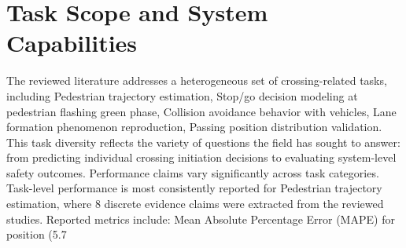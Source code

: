 \documentclass{article}
\begin{document}
\section{Task Scope and System Capabilities}
The reviewed literature addresses a heterogeneous set of crossing-related tasks, including Pedestrian trajectory estimation, Stop/go decision modeling at pedestrian flashing green phase, Collision avoidance behavior with vehicles, Lane formation phenomenon reproduction, Passing position distribution validation. This task diversity reflects the variety of questions the field has sought to answer: from predicting individual crossing initiation decisions to evaluating system-level safety outcomes. Performance claims vary significantly across task categories. Task-level performance is most consistently reported for Pedestrian trajectory estimation, where 8 discrete evidence claims were extracted from the reviewed studies. Reported metrics include: Mean Absolute Percentage Error (MAPE) for position (5.7%
\end{document}
